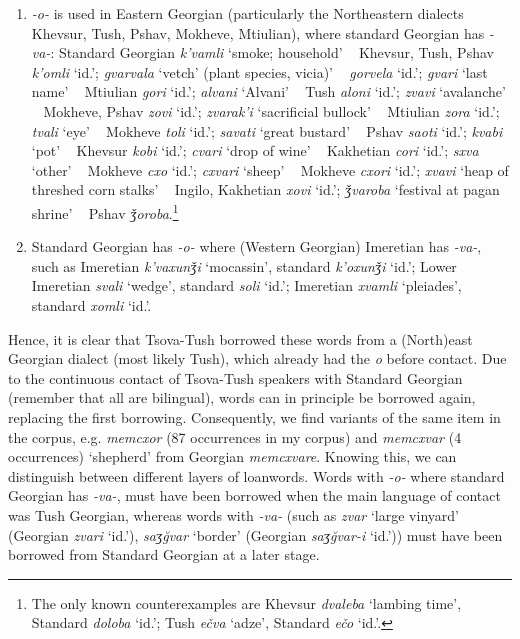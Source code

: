 \begin{enumerate}
\item \textit{-o-} is used in Eastern Georgian (particularly the Northeastern dialects Khevsur, Tush, Pshav, Mokheve, Mtiulian), where standard Georgian has \mbox{\textit{-va-}:}
Standard Georgian \textit{k'vamli}  `smoke; household' ~ Khevsur, Tush, Pshav \textit{k'omli} `id.';
\textit{gvarvala} `vetch' (plant species, vicia)' ~ \textit{gorvela} `id.';
\textit{gvari} `last name' ~ Mtiulian \textit{gori} `id.';
\textit{alvani} `Alvani' ~ Tush \textit{aloni} `id.';
\textit{zvavi} `avalanche' ~ Mokheve, Pshav \textit{zovi} `id.';
\textit{zvarak'i} `sacrificial bullock' ~ Mtiulian \textit{zora} `id.';
\textit{tvali} `eye' ~ Mokheve \textit{toli} `id.';
\textit{savati} `great bustard' ~ Pshav \textit{saoti} `id.';
\textit{kvabi} `pot' ~ Khevsur \textit{kobi} `id.';
\textit{cvari} `drop of wine' ~ Kakhetian \textit{cori} `id.';
\textit{sxva} `other' ~ Mokheve \textit{cxo} `id.';
\textit{cxvari} `sheep' ~ Mokheve \textit{cxori} `id.';
\textit{xvavi} `heap of threshed corn stalks' ~ Ingilo, Kakhetian \textit{xovi} `id.';
\textit{ǯvaroba} `festival at pagan shrine' ~ Pshav \textit{ǯoroba}.\footnote{The only known counterexamples are Khevsur \textit{dvaleba} `lambing time', Standard \textit{doloba} `id.'; Tush \textit{ečva} `adze', Standard \textit{ečo} `id.'.}

\item Standard Georgian has \textit{-o-} where (Western Georgian) Imeretian  has \mbox{\textit{-va-},} such as Imeretian \textit{k'vaxunǯi} `mocassin', standard \textit{k'oxunǯi} `id.';
Lower Imeretian \textit{svali} `wedge', standard \textit{soli} `id.';
Imeretian \textit{xvamli} `pleiades', standard \textit{xomli} `id.'.
\end{enumerate}

Hence, it is clear that Tsova-Tush borrowed these words from a (North)east Georgian dialect (most likely Tush), which already had the \textit{o} before contact. Due to the continuous contact of Tsova-Tush speakers with Standard Georgian (remember that all are bilingual), words can in principle be borrowed again, replacing the first borrowing. Consequently, we find variants of the same item in the corpus, e.g. \textit{memcxor} (87 occurrences in my corpus) and \textit{memcxvar} (4 occurrences) ‘shepherd’ from Georgian \textit{memcxvare}. Knowing this, we can distinguish between different layers of loanwords. Words with \textit{-o-} where standard Georgian has \textit{-va-}, must have been borrowed when the main language of contact was Tush Georgian, whereas words with \textit{-va-} (such as \textit{zvar} `large vinyard' (Georgian \textit{zvari} `id.'), \textit{saʒ\u{g}var} `border' (Georgian \textit{saʒ\u{g}var-i} `id.')) must have been borrowed from Standard Georgian at a later stage.

